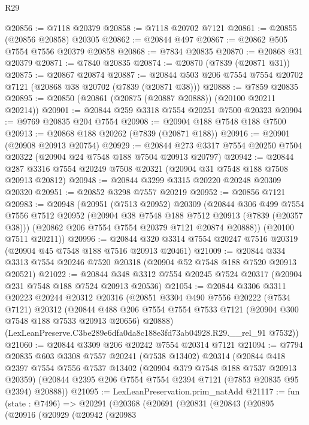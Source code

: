 \begin{lexlean}{R29}
\begin{coremodule}
@20856 := @7118 @20379
@20858 := @7118 @20702 @7121
@20861 := @20855 (@20856 @20858) @20305
@20862 := @20844 @497
@20867 := @20862 @505 @7554 @7556 @20379 @20858
@20868 := @7834 @20835
@20870 := @20868 @31 @20379
@20871 := @7840 @20835
@20874 := @20870 (@7839 (@20871 @31))
@20875 := @20867 @20874
@20887 := @20844 @503 @206 @7554 @7554 @20702 @7121 (@20868 @38 @20702 (@7839 (@20871 @38)))
@20888 := @7859 @20835
@20895 := @20850 (@20861 (@20875 (@20887 @20888)) (@20100 @20211 @20214))
@20901 := @20844 @259 @3318 @7554 @20251 @7500 @20323
@20904 := @9769 @20835 @204 @7554
@20908 := @20904 @188 @7548 @188 @7500
@20913 := @20868 @188 @20262 (@7839 (@20871 @188))
@20916 := @20901 (@20908 @20913 @20754)
@20929 := @20844 @273 @3317 @7554 @20250 @7504 @20322 (@20904 @24 @7548 @188 @7504 @20913 @20797)
@20942 := @20844 @287 @3316 @7554 @20249 @7508 @20321 (@20904 @31 @7548 @188 @7508 @20913 @20812)
@20948 := @20844 @3299 @3315 @20220 @20248 @20309 @20320
@20951 := @20852 @3298 @7557 @20219
@20952 := @20856 @7121
@20983 := @20948
    (@20951
      (@7513 @20952)
      @20309
      (@20844
        @306
        @499
        @7554
        @7556
        @7512
        @20952
        (@20904 @38 @7548 @188 @7512 @20913 (@7839 (@20357 @38)))
        (@20862 @206 @7554 @7554 @20379 @7121 @20874 @20888))
      (@20100 @7511 @20211))
@20996 := @20844 @320 @3314 @7554 @20247 @7516 @20319 (@20904 @45 @7548 @188 @7516 @20913 @20461)
@21009 := @20844 @334 @3313 @7554 @20246 @7520 @20318 (@20904 @52 @7548 @188 @7520 @20913 @20521)
@21022 := @20844 @348 @3312 @7554 @20245 @7524 @20317 (@20904 @231 @7548 @188 @7524 @20913 @20536)
@21054 := @20844
    @3306
    @3311
    @20223
    @20244
    @20312
    @20316
    (@20851
      @3304
      @490
      @7556
      @20222
      (@7534 @7121)
      @20312
      (@20844 @488 @206 @7554 @7554 @7533 @7121 (@20904 @300 @7548 @188 @7533 @20913 @20656) @20888)
      (LexLeanPreserve.C3be289e6dfa0da8c188e3fd73ab04928.R29.__rel_91 @7532))
@21060 := @20844 @3309 @206 @20242 @7554 @20314 @7121
@21094 := @7794
    @20835
    @603
    @3308
    @7557
    @20241
    (@7538 @13402)
    @20314
    (@20844
      @418
      @2397
      @7554
      @7556
      @7537
      @13402
      (@20904 @379 @7548 @188 @7537 @20913 @20359)
      (@20844 @2395 @206 @7554 @7554 @2394 @7121 (@7853 @20835 @95 @2394) @20888))
@21095 := LexLeanPreservation.prim_natAdd
@21117 := fun (state : @7496) =>
  @20291
    (@20368
      (@20691
        (@20831
          (@20843
            (@20895
              (@20916
                (@20929
                  (@20942
                    (@20983

\end{coremodule}
\end{lexlean}
